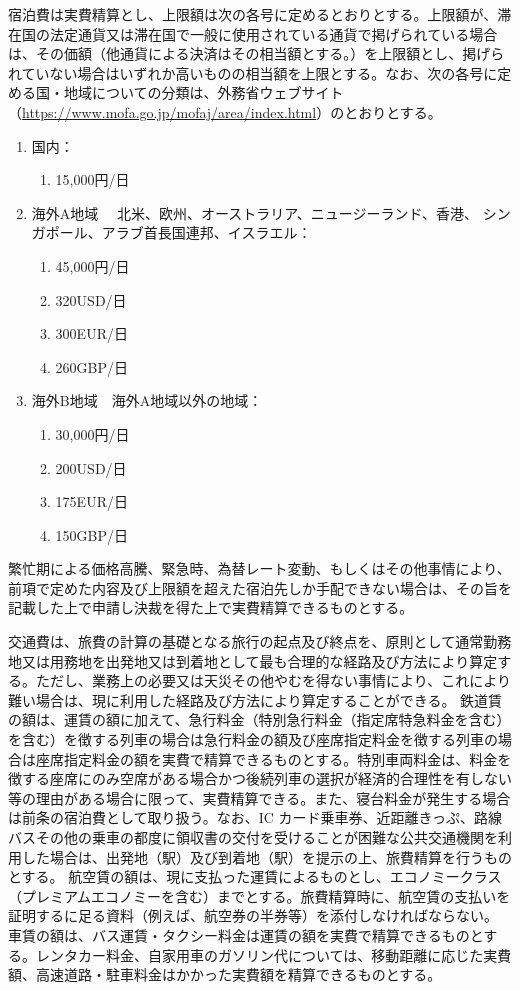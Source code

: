 \documentclass[10pt,a4paper,uplatex]{jsarticle}
\begin{document}
宿泊費は実費精算とし、上限額は次の各号に定めるとおりとする。上限額が、滞在国の法定通貨又は滞在国で一般に使用されている通貨で掲げられている場合は、その価額（他通貨による決済はその相当額とする。）を上限額とし、掲げられていない場合はいずれか高いものの相当額を上限とする。なお、次の各号に定める国・地域についての分類は、外務省ウェブサイト（\url{https://www.mofa.go.jp/mofaj/area/index.html}）のとおりとする。
\begin{enumerate}
    \item 国内：
    \begin{enumerate}
        \item 15,000円/日
    \end{enumerate}
    \item 海外A地域 　北米、欧州、オーストラリア、ニュージーランド、香港、 シンガポール、アラブ首長国連邦、イスラエル：
    \begin{enumerate}
        \item 45,000円/日
        \item 320USD/日
        \item 300EUR/日
        \item 260GBP/日
    \end{enumerate}
    \item 海外B地域　海外A地域以外の地域：
    \begin{enumerate}
        \item 30,000円/日
        \item 200USD/日
        \item 175EUR/日
        \item 150GBP/日
    \end{enumerate}
\end{enumerate}
\term 繁忙期による価格高騰、緊急時、為替レート変動、もしくはその他事情により、前項で定めた内容及び上限額を超えた宿泊先しか手配できない場合は、その旨を記載した上で申請し決裁を得た上で実費精算できるものとする。

交通費は、旅費の計算の基礎となる旅行の起点及び終点を、原則として通常勤務地又は用務地を出発地又は到着地として最も合理的な経路及び方法により算定する。ただし、業務上の必要又は天災その他やむを得ない事情により、これにより難い場合は、現に利用した経路及び方法により算定することができる。
\term 鉄道賃の額は、運賃の額に加えて、急行料金（特別急行料金（指定席特急料金を含む）を含む）を徴する列車の場合は急行料金の額及び座席指定料金を徴する列車の場合は座席指定料金の額を実費で精算できるものとする。特別車両料金は、料金を徴する座席にのみ空席がある場合かつ後続列車の選択が経済的合理性を有しない等の理由がある場合に限って、実費精算できる。また、寝台料金が発生する場合は前条の宿泊費として取り扱う。なお、IC カード乗車券、近距離きっぷ、路線バスその他の乗車の都度に領収書の交付を受けることが困難な公共交通機関を利用した場合は、出発地（駅）及び到着地（駅）を提示の上、旅費精算を行うものとする。
\term 航空賃の額は、現に支払った運賃によるものとし、エコノミークラス（プレミアムエコノミーを含む）までとする。旅費精算時に、航空賃の支払いを証明するに足る資料（例えば、航空券の半券等）を添付しなければならない。
\term 車賃の額は、バス運賃・タクシー料金は運賃の額を実費で精算できるものとする。レンタカー料金、自家用車のガソリン代については、移動距離に応じた実費額、高速道路・駐車料金はかかった実費額を精算できるものとする。
\end{document}

